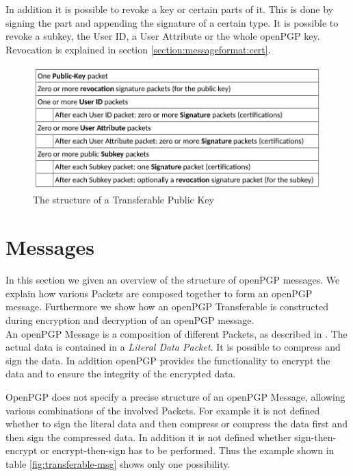 In addition it is possible to revoke a key or certain parts of it. This is done by signing the part and appending the signature of a certain type. It is possible to revoke a subkey, the User ID, a User Attribute or the whole openPGP key. Revocation is explained in section \ref{section:messageformat:cert}.

\begin{figure}[h]
	\centering
	\includegraphics[width=1\linewidth]{figures/transferable-key.png}
	\caption{The structure of a Transferable Public Key}
	\label{fig:transferable-key}
\end{figure}

\section{Messages}
\label{section:messageformat:messages}

In this section we given an overview of the structure of openPGP messages. We explain how various Packets are composed together to form an openPGP message. Furthermore we show how an openPGP Transferable is constructed during encryption and decryption of an openPGP message. \\

An openPGP Message is a composition of different Packets, as described in \cite[section 11.3]{RFC4880}. The actual data is contained in a \textit{Literal Data Packet}. It is possible to compress and sign the data. In addition openPGP provides the functionality to encrypt the data and to ensure the integrity of the encrypted data.

OpenPGP does not specify a precise structure of an openPGP Message, allowing various combinations of the involved Packets. For example it is not defined whether to sign the literal data and then compress or compress the data first and then sign the compressed data. In addition it is not defined whether sign-then-encrypt or encrypt-then-sign has to be performed. Thus the example shown in table \ref{fig:transferable-msg} shows only one possibility.

